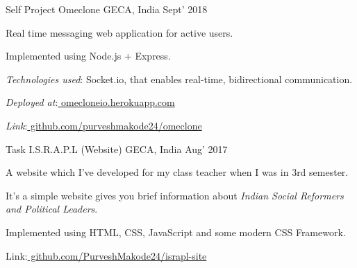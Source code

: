 

\begin{cventries}

  \cventry
    {Self Project}  
    {Omeclone} %
    {GECA, India} %
    {Sept’ 2018} %
    {
      \begin{cvitems} %
      	\item {Real time messaging web application for active users.}
        \item {Implemented using Node.js + Express.}
        \item {{\em Technologies used}: Socket.io, that enables real-time, bidirectional communication. }
        \item {{\em Deployed at}:\href{https://omecloneio.herokuapp.com/}{ omecloneio.herokuapp.com}}
        \item {{\em Link}:\href{https://github.com/purveshmakode24/omeclone}{ github.com/purveshmakode24/omeclone}} 
      \end{cvitems}
    }

  \cventry
    {Task} %
    {I.S.R.A.P.L (Website)} %
    {GECA, India} %
    {Aug’ 2017} %
    {
      \begin{cvitems} %
        \item {A website which I’ve developed for my class teacher when I was in 3rd semester. }
        \item {It’s a simple website gives you brief information about {\em Indian Social Reformers and Political Leaders}.}
        \item {Implemented using HTML, CSS, JavaScript and some modern CSS Framework.}
        \item {Link:\href{https://github.com/PurveshMakode24/israpl-site}{ github.com/PurveshMakode24/israpl-site}}
      \end{cvitems}
    }
    

\end{cventries}

